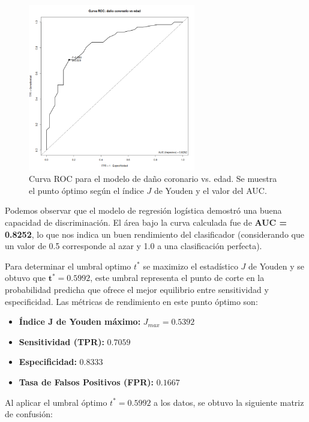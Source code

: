 \begin{figure}[H]
    \centering
    \includegraphics[width=0.65\textwidth]{images/roc_coro.png}
    \caption{Curva ROC para el modelo de daño coronario vs. edad. Se muestra el punto óptimo según el índice $J$ de Youden y el valor del AUC.}
    \label{fig:roc}
\end{figure}

Podemos observar que el modelo de regresión logística demostró una buena capacidad de discriminación. El área bajo la curva calculada fue de \textbf{AUC = 0.8252}, lo que nos indica un buen rendimiento del clasificador (considerando que un valor de 0.5 corresponde al azar y 1.0 a una clasificación perfecta).

Para determinar el umbral optimo $t^*$ se maximizo el estadístico $J$ de Youden y se obtuvo que $\mathbf{t^* = 0.5992}$, este umbral representa el punto de corte en la probabilidad predicha que ofrece el mejor equilibrio entre sensitividad y especificidad. Las métricas de rendimiento en este punto óptimo son:

\begin{itemize}
    \item \textbf{Índice J de Youden máximo:} $J_{max} = 0.5392$
    \item \textbf{Sensitividad (TPR):} $0.7059$
    \item \textbf{Especificidad:} $0.8333$
    \item \textbf{Tasa de Falsos Positivos (FPR):} $0.1667$
\end{itemize}

Al aplicar el umbral óptimo $t^*=0.5992$ a los datos, se obtuvo la siguiente matriz de confusión:

